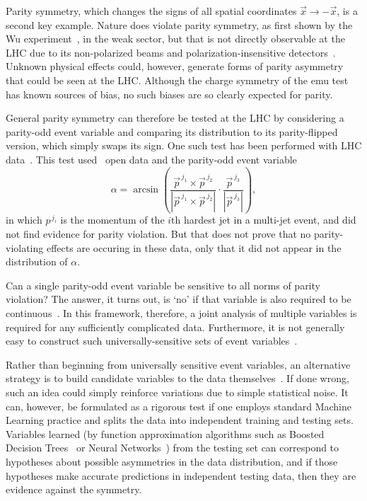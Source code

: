 Parity symmetry, which changes the signs of all spatial coordinates
$\vec x\rightarrow -\vec x$, is a second key example.
Nature does violate parity symmetry, as first shown by the Wu
experiment~\cite{PhysRev.105.1413}, in the weak sector, but that is not
directly observable at the LHC due to its non-polarized beams and
polarization-insensitive detectors~\cite{Lester:2019bso}.
Unknown physical effects could, however, generate forms of parity asymmetry
that could be seen at the LHC.
Although the charge symmetry of the emu test has known sources of bias,
no such biases are so clearly expected for parity.

General parity symmetry can therefore be tested at the LHC by considering a
parity-odd event variable and comparing its distribution to its parity-flipped
version, which simply swaps its sign.
One such test has been performed with LHC data~\cite{Lester:2019bso}.
This test used \cms\ open data and the parity-odd event variable
\begin{equation}
\label{eqn:cms_alpha}
\alpha
= \arcsin\!
\left(
\frac{
\vec p^{\,j_1} \times \vec p^{\,j_2}
}{
|\vec p^{\,j_1} \times \vec p^{\,j_2}|
}
\cdot
\frac{
\vec p^{\,j_3}
}{
|\vec p^{\,j_3}|
}
\right)
,
\end{equation}
in which $p^{\,j_i}$ is the momentum of the $i$th hardest jet in a multi-jet
event,
and did not find evidence for parity violation.
But that does not prove that no parity-violating effects are occuring in these
data, only that it did not appear in the distribution of $\alpha$.

Can a single parity-odd event variable be sensitive to all norms of parity
violation?
The answer, it turns out, is `no' if that variable is also required to be
continuous~\cite{lesterChiralMeasurements2021}.
In this framework, therefore, a joint analysis of multiple variables is
required for any sufficiently complicated data.
Furthermore, it is not generally easy to construct such universally-sensitive
sets of event variables~\cite{
Gripaios:2020hya,
lester2021lorentz
}.

Rather than beginning from universally sensitive event variables, an
alternative strategy is to build candidate variables to the data
themselves~\cite{lester2021stressed}.
If done wrong, such an idea could simply reinforce variations due to simple
statistical noise.
It can, however, be formulated as a rigorous test if one employs standard
Machine Learning practice and splits the data into independent training and
testing sets.
Variables learned (by function approximation algorithms such as
Boosted Decision Trees~\cite{xgboost} or
Neural Networks~\cite{MurphyKevinP.2012Mlap})
from the testing set can correspond to hypotheses about possible asymmetries
in the data distribution, and if those hypotheses make accurate predictions in
independent testing data, then they are evidence against the symmetry.

